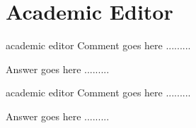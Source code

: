 %
%
\section*{Academic Editor}
%
%
\begin{ReviewerComment}{academic editor}
Comment goes here .........\end{ReviewerComment}
\begin{Answer}
Answer goes here .........
\end{Answer}


\begin{ReviewerComment}{academic editor}
Comment goes here .........\end{ReviewerComment}
\begin{Answer}
Answer goes here .........
\end{Answer}